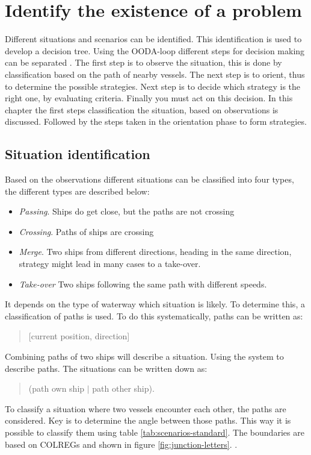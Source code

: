 \chapter{Identify the existence of a problem}
Different situations and scenarios can be identified. This identification is used to develop a decision tree. Using the OODA-loop different steps for decision making can be separated . The first step is to observe the situation, this is done by classification based on the path of nearby vessels. The next step is to orient, thus to determine the possible strategies. Next step is to decide which strategy is the right one, by evaluating criteria. Finally you must act on this decision. In this chapter the first steps classification the situation, based on observations is discussed. Followed by the steps taken in the orientation phase to form strategies.

\section{Situation identification}
\label{sec:situation-identification}
Based on the observations different situations can be classified into four types, the different types are described below: 
\begin{itemize}
	\item \emph{Passing}. Ships do get close, but the paths are not crossing
	\item \emph{Crossing}. Paths of ships are crossing
	\item \emph{Merge}. Two ships from different directions, heading in the same direction, strategy might lead in many cases to a take-over.
	\item \emph{Take-over} Two ships following the same path with different speeds.
\end{itemize}
It depends on the type of waterway which situation is likely. To determine this, a classification of paths is used. To do this systematically, paths can be written as: 
\begin{quote}
	[current position, direction]
\end{quote}
Combining paths of two ships will describe a situation. Using the system to describe paths. The situations can be written down as:
\begin{quote}
	(path own ship $|$ path other ship).
\end{quote}

To classify a situation where two vessels encounter each other, the paths are considered. Key is to determine the angle between those paths. This way it is possible to classify them using table \ref{tab:scenarios-standard}.
The boundaries are based on \ac{COLREGs} and shown in figure \ref{fig:junction-letters}. .

